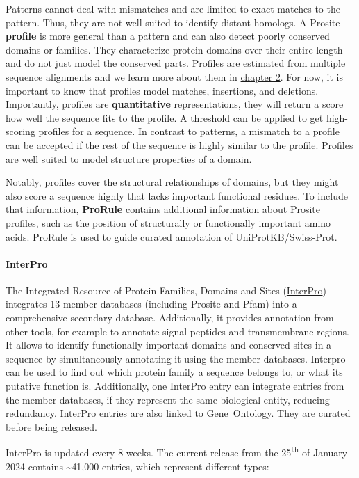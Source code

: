 Patterns cannot deal with mismatches and are limited to exact matches to the pattern.
Thus, they are not well suited to identify distant homologs.
A Prosite \textbf{profile} is more general than a pattern and can also detect poorly conserved domains or families.
They characterize protein domains over their entire length and do not just model the conserved parts.
Profiles are estimated from multiple sequence alignments and we learn more about them in \href{/chapter2}{chapter 2}.
For now, it is important to know that profiles model matches, insertions, and deletions.
Importantly, profiles are \textbf{quantitative} representations, they will return a score how well the sequence fits to the profile.
A threshold can be applied to get high-scoring profiles for a sequence.
In contrast to patterns, a mismatch to a profile can be accepted if the rest of the sequence is highly similar to the profile.
Profiles are well suited to model structure properties of a domain.

Notably, profiles cover the structural relationships of domains, but they might also score a sequence highly that lacks important functional residues.
To include that information, \textbf{ProRule} contains additional information about Prosite profiles, such as the position of structurally or functionally important amino acids.
ProRule is used to guide curated annotation of UniProtKB/Swiss-Prot.

\paragraph{InterPro}\label{chapter1_interpro}

The Integrated Resource of Protein Families, Domains and Sites (\href{https://www.ebi.ac.uk/interpro/}{InterPro}) integrates 13 member databases (including Prosite and Pfam) into a comprehensive secondary database.
Additionally, it provides annotation from other tools, for example to annotate signal peptides and transmembrane regions.
It allows to identify functionally important domains and conserved sites in a sequence by simultaneously annotating it using the member databases.
Interpro can be used to find out which protein family a sequence belongs to, or what its putative function is.
Additionally, one InterPro entry can integrate entries from the member databases, if they represent the same biological entity, reducing redundancy.
InterPro entries are also linked to Gene~Ontology.
They are curated before being released.

InterPro is updated every 8 weeks. The current release from the 25\textsuperscript{th} of January 2024 contains {\textasciitilde}41,000 entries, which represent different types:

